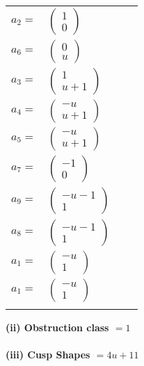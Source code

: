 \documentclass[1p]{elsarticle_modified}
\theoremstyle{definition}
\begin{document}
\begin{tabular}{m{7pt} m{180pt} m{7pt} m{180pt} }
\flushright $a_{2}=$&$\begin{pmatrix}1\\0\end{pmatrix}$ \\
\flushright $a_{6}=$&$\begin{pmatrix}0\\u\end{pmatrix}$ \\
\flushright $a_{3}=$&$\begin{pmatrix}1\\u+1\end{pmatrix}$ \\
\flushright $a_{4}=$&$\begin{pmatrix}- u\\u+1\end{pmatrix}$ \\
\flushright $a_{5}=$&$\begin{pmatrix}- u\\u+1\end{pmatrix}$ \\
\flushright $a_{7}=$&$\begin{pmatrix}-1\\0\end{pmatrix}$ \\
\flushright $a_{9}=$&$\begin{pmatrix}- u-1\\1\end{pmatrix}$ \\
\flushright $a_{8}=$&$\begin{pmatrix}- u-1\\1\end{pmatrix}$ \\
\flushright $a_{1}=$&$\begin{pmatrix}- u\\1\end{pmatrix}$\\ \flushright $a_{1}=$&$\begin{pmatrix}- u\\1\end{pmatrix}$\\&\end{tabular}
\flushleft \textbf{(ii) Obstruction class $= 1$}\\~\\
\flushleft \textbf{(iii) Cusp Shapes $= 4 u+11$}\\~\\
\end{document}
